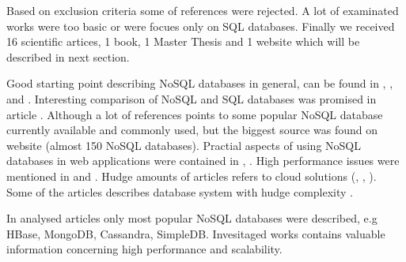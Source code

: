 \documentclass[times, 10pt,twocolumn]{article}
\begin{document}
Based on exclusion criteria some of references were rejected. A lot of examinated works were too basic or were focues only on SQL databases.
Finally we received 16 scientific artices, 1 book, 1 Master Thesis and 1 website which will be described in next section. 




Good starting point describing NoSQL databases in general, can be found in \cite{survey}, \cite{strauch}, \cite{leavittm} and \cite{prasad}. Interesting 
comparison of NoSQL and SQL databases was promised in article \cite{cattell}. Although a lot of references points to some popular NoSQL database currently 
available and commonly used, but the biggest source was found on website \cite{nosql-database} (almost 150 NoSQL databases). Practial aspects of using NoSQL 
databases in web applications were contained in \cite{tiwari} \cite{orend}, \cite{pokorny}. High performance issues were mentioned in \cite{taniar} and \cite{delis}.
Hudge amounts of articles refers to cloud solutions (\cite{sakr}, \cite{konstantinou}, \cite{delis}). Some of the articles describes database system with hudge 
complexity \cite{rizzotti}. 




In analysed articles only most popular NoSQL databases were described, e.g HBase, MongoDB, Cassandra, SimpleDB.
Invesitaged works contains valuable information concerning high performance and scalability. 


\end{document}
